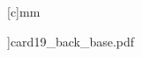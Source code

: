\documentclass[letterpaper]{article}
\begin{document}
\begin{minipage}[c]{\cropedBoundariesH mm}[c]{\cropedBoundariesW mm}
	
					]{card19_back_base.pdf}
\end{minipage}
\end{document}

